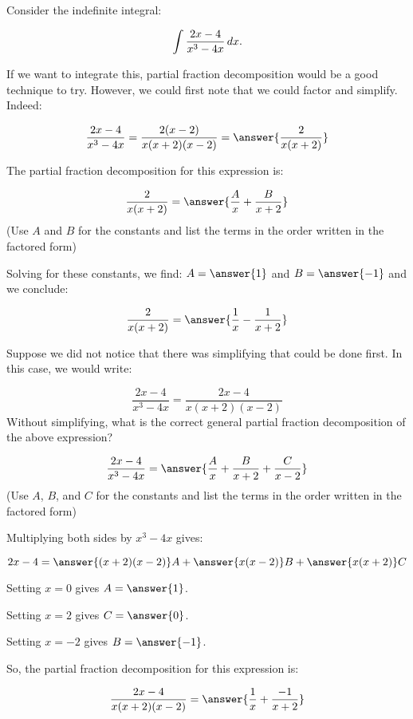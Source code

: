 \documentclass{ximera}
\author{Jim Talamo}
\begin{document}
\begin{exercise}
Consider the indefinite integral: 

\[
\int \frac{2x-4}{x^3-4x} \mathop{}\!d x.
\]

If we want to integrate this, partial fraction decomposition would be a good technique to try.  However, we could first note that we could factor and simplify.  Indeed:

\[
\frac{2x-4}{x^3-4x} = \frac{2(x-2)}{x(x+2)(x-2)} = \answer{\frac{2}{x(x+2)}}
\]  

The partial fraction decomposition for this expression is:

\[
\frac{2}{x(x+2)} = \answer{\frac{A}{x}+\frac{B}{x+2}}
\]
(Use $A$ and $B$ for the constants and list the terms in the order written in the factored form)

\begin{exercise}
Solving for these constants, we find: $A = \answer{1}$ and $B=\answer{-1}$ and we conclude:

\[
\frac{2}{x(x+2)} = \answer{\frac{1}{x}-\frac{1}{x+2}}
\]


\begin{exercise}
Suppose we did not notice that there was simplifying that could be done first.  In this case, we would write:

\[
\frac{2x-4}{x^3-4x} = \frac{2x-4}{x(x+2)(x-2)} 
\]  
Without simplifying, what is the correct general partial fraction decomposition of the above expression?

\[
\frac{2x-4}{x^3-4x} = \answer{\frac{A}{x}+\frac{B}{x+2} +\frac{C}{x-2}}
\]  
(Use $A$, $B$, and $C$ for the constants and list the terms in the order written in the factored form)

\begin{exercise}

Multiplying both sides by $x^3-4x$ gives:

\[
2x-4 = \answer{(x+2)(x-2)}A+\answer{x(x-2)}B +\answer{x(x+2)}C
\]  

\begin{exercise}
Setting $x=0$ gives $A=\answer{1}$.

Setting $x=2$ gives $C=\answer{0}$.

Setting $x=-2$ gives $B=\answer{-1}$.

So, the partial fraction decomposition for this expression is:

\[
\frac{2x-4}{x(x+2)(x-2)}  = \answer{\frac{1}{x}+\frac{-1}{x+2}}
\]


\begin{multipleChoice}
\end{multipleChoice}


\end{exercise}
\end{exercise}
\end{exercise}
\end{exercise}
\end{exercise}
\end{document}

